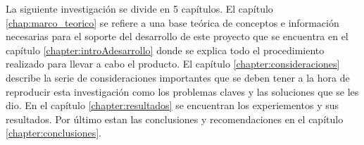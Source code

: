 La siguiente investigaci\'on se divide en 5 cap\'itulos. El cap\'itulo \ref{chap:marco_teorico} se refiere a una base te\'orica de conceptos e informaci\'on necesarias para el soporte del desarrollo de este proyecto que se encuentra en el cap\'itulo  \ref{chapter:introAdesarrollo} donde se explica todo el procedimiento realizado para llevar a cabo el producto. El cap\'itulo \ref{chapter:consideraciones} describe la serie de consideraciones importantes que se deben tener a la hora de reproducir esta investigaci\'on como los problemas claves y las soluciones que se les dio. En el cap\'itulo \ref{chapter:resultados} se encuentran  los experiementos y sus resultados. Por \'ultimo estan las conclusiones y recomendaciones en el capítulo \ref{chapter:conclusiones}. 
